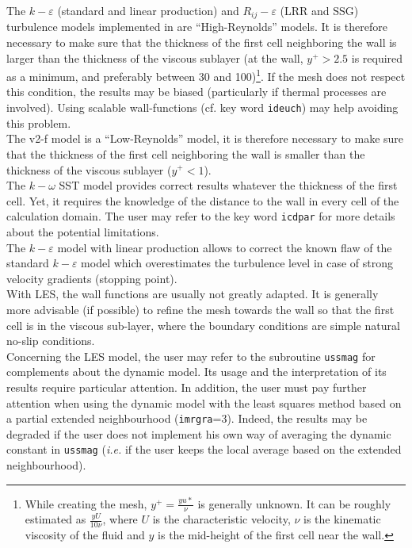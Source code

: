 The $k-\varepsilon$ (standard and linear production) and $R_{ij}-\varepsilon$
(LRR and SSG) turbulence
models implemented in \CS are ``High-Reynolds'' models. It is therefore
necessary to make sure that the thickness of the first cell neighboring
the wall is larger than the thickness of the viscous sublayer (at the
wall, $y^+>2.5$ is required as a minimum, and preferably between 30 and
100)\footnote{While creating the mesh, $y^+=\frac{yu*}{\nu}$ is
generally unknown. It can be roughly estimated as $\frac{yU}{10\nu}$, where
$U$ is the characteristic velocity, $\nu$ is the kinematic viscosity of the fluid
 and $y$ is the mid-height of the first cell near the wall.}. If the mesh does
 not respect this condition, the results may be biased
(particularly if thermal processes are involved). Using scalable wall-functions
(cf. key word {\tt ideuch}) may help avoiding this problem.\\
The v2-f model is a ``Low-Reynolds'' model, it is therefore necessary to
make sure that the thickness of the first cell neighboring the wall is
smaller than the thickness of the viscous sublayer ($y^+<1$).\\
The $k-\omega$ SST model provides correct results whatever the thickness of the first cell.
Yet, it requires the knowledge of the distance to the wall in every
cell of the calculation domain. The user may refer to the key word
{\tt icdpar} for more details about the potential limitations.\\
The $k-\varepsilon$ model with linear production allows to correct the
known flaw of the standard $k-\varepsilon$ model which overestimates the
turbulence level in case of strong velocity gradients (stopping point).\\
With LES, the wall functions are usually not greatly adapted. It is generally more advisable
(if possible) to refine the mesh towards the wall so that the first cell is in the
viscous sub-layer, where the boundary conditions are simple natural no-slip conditions.\\
Concerning the LES model, the user may refer to the subroutine
\texttt{ussmag} for complements about the dynamic model. Its usage
and the interpretation of its results require particular attention.
In addition, the user must pay further attention when using the dynamic
model with the least squares method based on a partial extended
neighbourhood ({\tt imrgra}=3). Indeed, the results may be degraded if the user
does not implement his own way of averaging the dynamic constant in
\texttt{ussmag} (\textit{i.e.} if the user keeps the local average based
on the extended neighbourhood).\\

